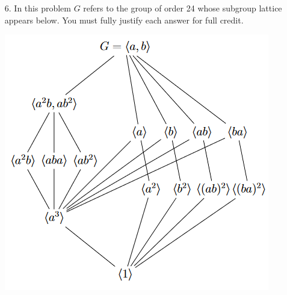 \begin{itemize}
\begin{enumerate}[(a)]
\begin{proof}
    \end{proof}
    
    \item  Let $I \subseteq R$ be an ideal. Show that its complement $S := R \setminus I$ is multiplicatively closed if and only if $R/I$ is an integral domain.
    \begin{proof}

    \end{proof}
    
    \item Suppose that $S$ is a multiplicatively closed subset of $R$ that does not contain 0. Show that there is an ideal in $P \subset R$ that is maximal with respect to the property that $P \cap S = \emptyset$.
    \begin{proof}

    \end{proof}
    
    \item Let $S$ be as in part (c) and suppose that $P$ is maximal with respect to the property that $P \cap S = \emptyset$. Show that $P$ is necessarily prime.
    \begin{proof}

    \end{proof}
\end{enumerate}












\item[6.] In this problem $G$ refers to the group of order 24 whose subgroup lattice appears
below. You must fully justify each answer for full credit.
\begin{center}
    \includegraphics[scale=0.5]{G24.png}
\end{center}


\end{itemize}
